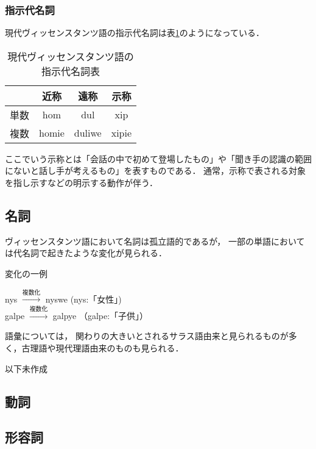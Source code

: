 \documentclass[a4paper,xelatex,ja=standard]{bxjsarticle}
\begin{document}
\subsubsection{指示代名詞}
現代ヴィッセンスタンツ語の指示代名詞は表\ref{vic_obj_pronoum}のようになっている．
\begin{table}[htbp]
 \caption{現代ヴィッセンスタンツ語の指示代名詞表}
 \label{vic_obj_pronoum}
 \begin{center}
  \begin{liparxecc}
   \begin{tabular}{|c||c|c|c|} \hline
    & 近称 & 遠称 & 示称 \\ \hline \hline
    単数 & hom & dul & xip \\ \hline
    複数 & homie & duliwe & xipie \\ \hline
   \end{tabular}
  \end{liparxecc}
 \end{center}
\end{table}

ここでいう示称とは「会話の中で初めて登場したもの」や「聞き手の認識の範囲にないと話し手が考えるもの」を表すものである．
通常，示称で表される対象を指し示すなどの明示する動作が伴う．

\subsection{名詞}
ヴィッセンスタンツ語において名詞は孤立語的であるが，
一部の単語においては代名詞で起きたような変化が見られる．
\begin{itembox}[l]{変化の一例}
 \begin{liparxecc}
   \begin{center}
    nys $\xrightarrow{\text{複数化}}$ nyswe (nys:「女性」) \\
    galpe $\xrightarrow{\text{複数化}}$ galpye （galpe:「子供」）
   \end{center}
 \end{liparxecc}
\end{itembox}

語彙については，
関わりの大きいとされるサラス語由来と見られるものが多く，古理語や現代理語由来のものも見られる．


以下未作成

\subsection{動詞}
\subsection{形容詞}
\end{document}
